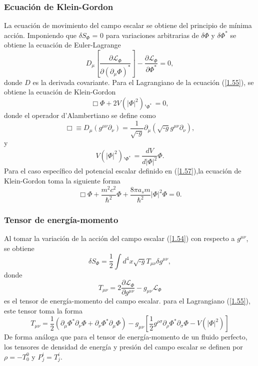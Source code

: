\documentclass[a4paper,openright,12pt]{book}
\begin{document}
\subsubsection{Ecuación de Klein-Gordon}
La ecuación de movimiento del campo escalar se obtiene del principio de mínima acción. Imponiendo que $\delta S_{\Phi}$ = 0 para variaciones arbitrarias de $\delta \Phi$ y $\delta \Phi^{*}$ se obtiene la ecuación de Euler-Lagrange
\begin{equation}
D_{\mu}\left[\frac{\partial\mathcal{L}_{\Phi}}{\partial(\partial_{\mu}\Phi)^{*}}\right] - \frac{\partial\mathcal{L}_{\Phi}}{\partial\Phi^{*}} = 0,\label{1.58}
\end{equation}
donde $D$ es la derivada covariante. Para el Lagrangiano de la ecuación (\ref{1.55}), se obtiene la ecuación de Klein-Gordon
\begin{equation}
\Box\Phi + 2V(|\Phi|^{2}),_{\Phi^{*}} = 0,
\end{equation}
donde el operador d'Alambertiano se define como
\begin{equation}
\Box \equiv D_{\mu}(g^{\mu\nu}\partial_{\nu})
=
\frac{1}{\sqrt{\textbf{-}g}}\partial_{\mu}(\sqrt{\textbf{-}g}g^{\mu\nu}\partial_{\nu}),
\end{equation}
y
\begin{equation}
V(|\Phi|^{2}),_{\Phi^{*}} = \frac{d V}{d |\Phi|^{2}}\Phi.
\end{equation}
Para el caso específico del potencial escalar definido en (\ref{1.57}),la ecuación de Klein-Gordon toma la siguiente forma
\begin{equation}
\Box\Phi + \frac{m^{2}c^{2}}{\hbar^{2}}\Phi + \frac{8\pi a_{s}m}{\hbar^{2}}|\Phi|^{2}\Phi = 0.
\end{equation}
\subsubsection{Tensor de energía-momento}
Al tomar la variación de la acción del campo escalar (\ref{1.54}) con respecto a $g^{\mu\nu}$, se obtiene
\begin{equation}
\delta S_{\Phi} = \frac{1}{2} \int d^{4}x\sqrt{\textbf{-}g}T_{\mu\nu}\delta g^{\mu\nu},
\end{equation}
donde
\begin{equation}
T_{\mu\nu} = 2\frac{\partial\mathcal{L}_{\Phi}}{\partial g^{\mu\nu}} - g_{\mu\nu}\mathcal{L}_{\Phi}
\end{equation}
es el tensor de energía-momento del campo escalar. para el Lagrangiano (\ref{1.55}), este tensor toma la forma
\begin{equation}
T_{\mu\nu} = \frac{1}{2}(\partial_{\mu}\Phi^{*}\partial_{\nu}\Phi + \partial_{\nu}\Phi^{*}\partial_{\mu}\Phi)
-
g_{\mu\nu}\left[
\frac{1}{2}g^{\rho\sigma}\partial_{\rho}\Phi^{*}\partial_{\sigma}\Phi
-
V(|\Phi|^{2})\right]
\end{equation}
De forma análoga que para el tensor de energía-momento de un fluido perfecto, los tensores de  densidad de energía y presión del campo escalar se definen por $\rho = -T^{0}_{0}$ y $P^{i}_{j} = T^{i}_{j}$.
\end{document}
